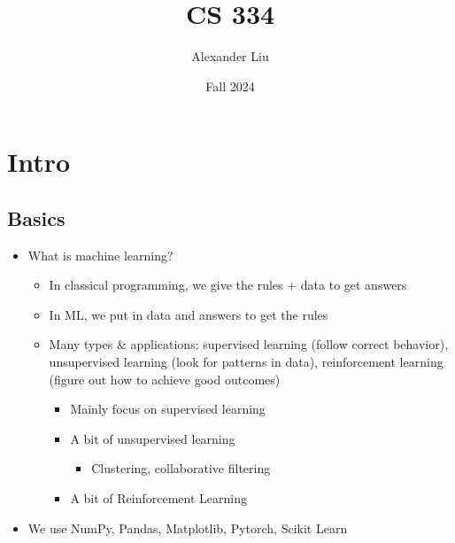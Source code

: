 \documentclass[10pt, oneside]{article}
\title{CS 334}
\author{Alexander Liu}
\date{Fall 2024}
\begin{document}
\maketitle
\tableofcontents

\vspace{.25in}
\newpage
\section{Intro}
\subsection{Basics}
\begin{itemize}
    \item What is machine learning?
    \begin{itemize}
        \item In classical programming, we give the rules + data to get answers
        \item In ML, we put in data and answers to get the rules
        \item Many types \& applications: supervised learning (follow correct behavior), unsupervised learning (look for patterns in data), reinforcement learning (figure out how to achieve good outcomes)
        \begin{itemize}
            \item Mainly focus on supervised learning
            \item A bit of unsupervised learning
            \begin{itemize}
                \item Clustering, collaborative filtering
            \end{itemize}
            \item A bit of Reinforcement Learning
        \end{itemize}
    \end{itemize}
    \item We use NumPy, Pandas, Matplotlib, Pytorch, Scikit Learn
\end{itemize}
\end{document}
